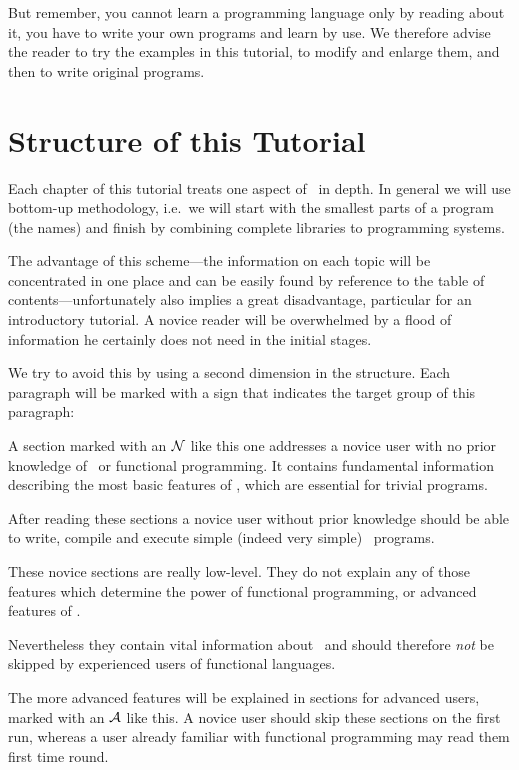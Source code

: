 But remember, you cannot learn a programming language only by reading
about it, you have to write your own programs and learn by use. 
We therefore advise the reader to try the examples in this tutorial, to
modify and enlarge them, and then to write original programs.


\section{Structure of this Tutorial}
\label{sec:structure}

Each chapter of this tutorial treats one aspect of \opal\  in depth.
In general we will use bottom-up methodology, i.e.~we will
start with the smallest parts of a program (the names) and finish by
combining complete libraries to programming systems.

The advantage of this scheme---the information on each topic will be
concentrated in one place and can be easily found by reference to  the
table of contents---unfortunately also implies a great 
disadvantage, particular for an  introductory tutorial.
A novice reader will be overwhelmed by a flood of information he
certainly does not need in the initial stages.

We try to avoid this  by using a second dimension in the structure. 
Each paragraph will be marked with a sign that indicates the target group
of this paragraph:

\novice A section marked with an $\cal N$ like this one addresses
a novice user with no prior knowledge of \opal\  or functional programming.
It contains fundamental information describing the most basic
features of \opal, which are  essential for trivial programs. 

After reading these sections a novice user without prior knowledge
should be able to write, compile and 
execute simple (indeed very simple) \opal\ programs.

These novice sections are really low-level. 
They do not explain any of those features which determine the
power of functional programming, or advanced features of \opal.

Nevertheless they contain vital information about \opal\  and should
therefore {\em not} be skipped by experienced users of functional languages.

\advanced The more advanced features will be explained in sections for
advanced users, marked with an $\cal A$ like this. 
A novice user should skip these sections on the first run, whereas a
user already familiar with functional programming may read them first
time round.

